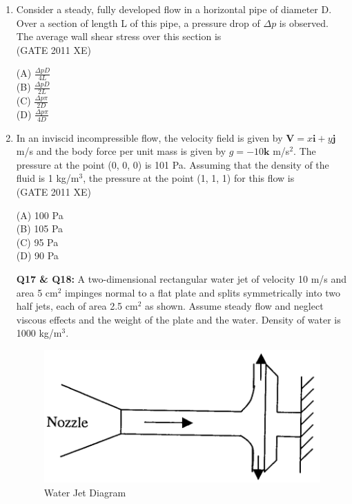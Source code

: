 \documentclass[journal,12pt,onecolumn]{IEEEtran}
\begin{document}
\begin{enumerate}
\item Consider a steady, fully developed flow in a horizontal pipe of diameter D. Over a section of length L of this pipe, a pressure drop of $\Delta p$ is observed. The average wall shear stress over this section is\\

\hfill{(GATE 2011 XE)} \\
\begin{multicols}{4}
(A) $\frac{\Delta p D}{4L}$\\
(B) $\frac{\Delta p D}{2L}$\\
(C) $\frac{\Delta p \pi}{2D}$\\
(D) $\frac{\Delta p \pi}{4D}$
\end{multicols}

\newpage

\item In an inviscid incompressible flow, the velocity field is given by $\mathbf{V} = x \mathbf{i} + y \mathbf{j}$ m/s and the body force per unit mass is given by $g = -10 \mathbf{k}$ m/s$^2$. The pressure at the point (0, 0, 0) is 101 Pa. Assuming that the density of the fluid is 1 kg/m$^3$, the pressure at the point (1, 1, 1) for this flow is\\

\hfill{(GATE 2011 XE)} \\
\begin{multicols}{4}
(A) 100 Pa\\
(B) 105 Pa\\
(C) 95 Pa\\
(D) 90 Pa
\end{multicols}


\item[\textbf{Q17 \& Q18:}]
A two-dimensional rectangular water jet of velocity 10 m/s and area 5 cm$^2$ impinges normal to a flat plate and splits symmetrically into two half jets, each of area 2.5 cm$^2$ as shown. Assume steady flow and neglect viscous effects and the weight of the plate and the water. Density of water is 1000 kg/m$^3$.\\

\begin{figure}[htbp]
  \centering
  \includegraphics[width=.65\columnwidth]{figs/B/fig4.png}
  \caption{Water Jet Diagram}
  \label{fig:figs/B/fig4.png}
\end{figure}


\end{enumerate}
\end{document}
